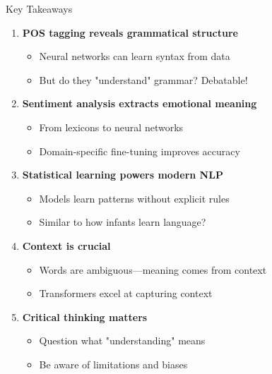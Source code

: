 \documentclass[aspectratio=169]{beamer}
\begin{document}
\begin{frame}[shrink=10]{Key Takeaways 🎯}
    \begin{enumerate}\setlength{\itemsep}{0pt}
        \item \textbf{POS tagging reveals grammatical structure}
        \begin{itemize}\setlength{\itemsep}{0pt}
            \item Neural networks can learn syntax from data
            \item But do they "understand" grammar? Debatable!
        \end{itemize}

        \item \textbf{Sentiment analysis extracts emotional meaning}
        \begin{itemize}\setlength{\itemsep}{0pt}
            \item From lexicons to neural networks
            \item Domain-specific fine-tuning improves accuracy
        \end{itemize}

        \item \textbf{Statistical learning powers modern NLP}
        \begin{itemize}\setlength{\itemsep}{0pt}
            \item Models learn patterns without explicit rules
            \item Similar to how infants learn language?
        \end{itemize}

        \item \textbf{Context is crucial}
        \begin{itemize}\setlength{\itemsep}{0pt}
            \item Words are ambiguous—meaning comes from context
            \item Transformers excel at capturing context
        \end{itemize}

        \item \textbf{Critical thinking matters}
        \begin{itemize}\setlength{\itemsep}{0pt}
            \item Question what "understanding" means
            \item Be aware of limitations and biases
        \end{itemize}
    \end{enumerate}
\end{frame}
\end{document}
